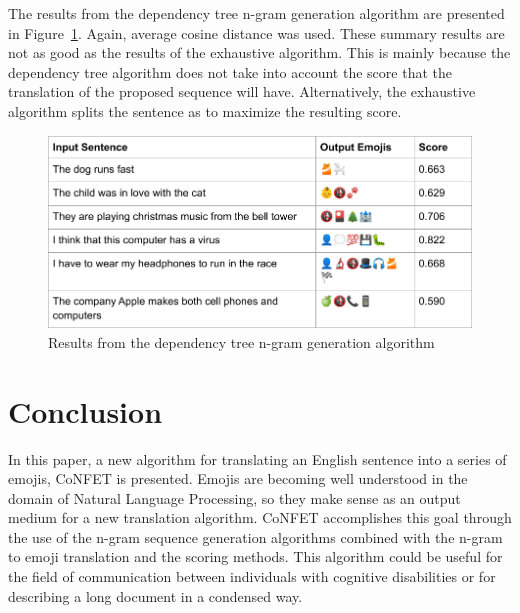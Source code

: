 \documentclass{article}[10]
\begin{document}
The results from the dependency tree n-gram generation algorithm are presented
in Figure~\ref{fig:dependency}. Again, average cosine distance was used. These
summary results are not as good as the results of the exhaustive algorithm. This
is mainly because the dependency tree algorithm does not take into account the
score that the translation of the proposed sequence will have. Alternatively, the exhaustive algorithm splits the sentence as to maximize the resulting
score.

\begin{figure}[H]
  \begin{center}
    \includegraphics[width=\columnwidth]{figures/dependency.png}
    \caption{Results from the dependency tree n-gram generation
      algorithm\label{fig:dependency}}
  \end{center}
\end{figure}

\section{Conclusion}

In this paper, a new algorithm for translating an English sentence into a series
of emojis, CoNFET is presented. Emojis are becoming well understood in the
domain of Natural Language Processing, so they make sense as an output medium
for a new translation algorithm. CoNFET accomplishes this goal through the use
of the n-gram sequence generation algorithms combined with the n-gram to emoji
translation and the scoring methods. This algorithm could be useful for the
field of communication between individuals with cognitive disabilities or for
describing a long document in a condensed way.
\end{document}
